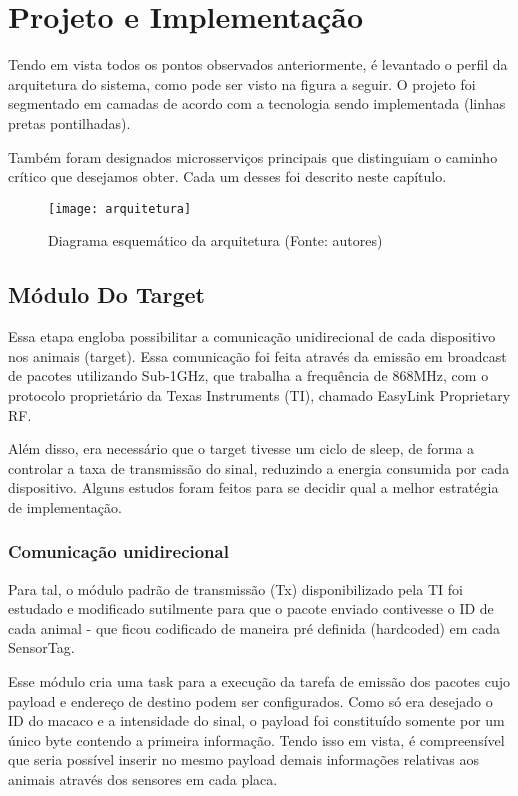 \chapter{Projeto e Implementação}

Tendo em vista todos os pontos observados anteriormente, é levantado o perfil da arquitetura do sistema, como pode ser visto na figura a seguir. O projeto foi segmentado em camadas de acordo com a tecnologia sendo implementada (linhas pretas pontilhadas).

Também foram designados microsserviços principais que distinguiam o caminho crítico que desejamos obter. Cada um desses foi descrito neste capítulo.

\begin{figure}[ht]
  \centering
    \texttt{[image: arquitetura]}
  \caption{Diagrama esquemático da arquitetura (Fonte: autores)}
\end{figure}
\FloatBarrier

\section{Módulo Do Target}

Essa etapa engloba possibilitar a comunicação unidirecional de cada dispositivo nos animais (target). Essa comunicação foi feita através da emissão em broadcast de pacotes utilizando Sub-1GHz, que trabalha a frequência de 868MHz, com o protocolo proprietário da Texas Instruments (TI), chamado EasyLink Proprietary RF.

Além disso, era necessário que o target tivesse um ciclo de sleep, de forma a controlar a taxa de transmissão do sinal, reduzindo a energia consumida por cada dispositivo. Alguns estudos foram feitos para se decidir qual a melhor estratégia de implementação.

\subsection{Comunicação unidirecional}

Para tal, o módulo padrão de transmissão (Tx) disponibilizado pela TI foi estudado e modificado sutilmente para que o pacote enviado contivesse o ID de cada animal - que ficou codificado de maneira pré definida (hardcoded) em cada SensorTag.

Esse módulo cria uma task para a execução da tarefa de emissão dos pacotes cujo payload e endereço de destino podem ser configurados. Como só era desejado o ID do macaco e a intensidade do sinal, o payload foi constituído somente por um único byte contendo a primeira informação. Tendo isso em vista, é compreensível que seria possível inserir no mesmo payload demais informações relativas aos animais através dos sensores em cada placa.

